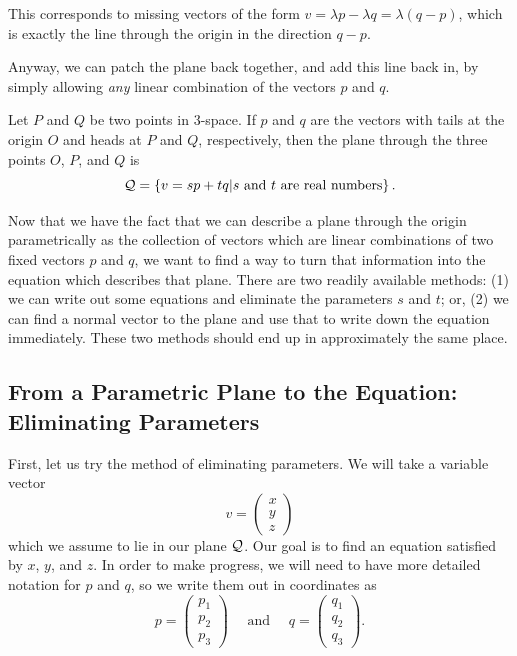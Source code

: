 \documentclass[00-livre-main.tex]{subfiles}
\begin{document}
This corresponds to missing vectors of the form $v = \lambda p - \lambda q = \lambda (q-p)$, which is exactly the line through the origin in the direction $q-p$.


Anyway, we can patch the plane back together, and add this line back in, by simply allowing \emph{any} linear combination of the vectors $p$ and $q$.

\begin{theorem}
Let $P$ and $Q$ be two points in $3$-space. If $p$ and $q$ are the vectors with tails at the origin $O$ and heads at $P$ and $Q$, respectively, then the plane through the three points $O$, $P$, and $Q$ is
\[
\mathcal{Q} = \left\{ v= s p + t q \middle| \text{$s$ and $t$ are real numbers}\right\}.
\]
\end{theorem}


Now that we have the fact that we can describe a plane through the origin parametrically as the collection of vectors which are linear combinations of two fixed vectors $p$ and $q$, we want to find a way to turn that information into the equation which describes that plane. There are two readily available methods: (1) we can write out some equations and eliminate the parameters $s$ and $t$; or, (2) we can find a normal vector to the plane and use that to write down the equation immediately. These two methods should end up in approximately the same place.

\subsection*{From a Parametric Plane to the Equation:\\ Eliminating Parameters}


First, let us try the method of eliminating parameters. We will take a variable vector
\[
v = \begin{pmatrix} x \\ y \\z \end{pmatrix}
\]
which we assume to lie in our plane $\mathcal{Q}$. Our goal is to find an equation satisfied by $x$, $y$, and $z$. In order to make progress, we will need to have more detailed notation for $p$ and $q$, so we write them out in coordinates as
\[
p = \begin{pmatrix} p_1 \\ p_2 \\ p_3 \end{pmatrix} \quad \text{ and } \quad
q = \begin{pmatrix} q_1 \\ q_2 \\ q_3 \end{pmatrix} .
\]
\end{document}
